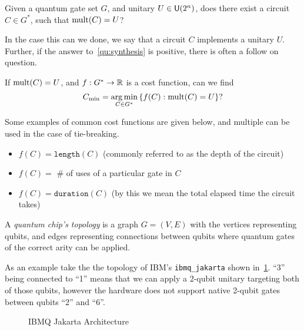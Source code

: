 \begin{question}\label{qu:synthesis}
    Given a quantum gate set $G$, and unitary $U\in\mathsf{U} (2^n)$, does there exist a circuit $C\in G^*$, such that $\operatorname{mult}(C) = U$?
\end{question}
In the case this can we done, we say that a circuit $C$ implements a unitary $U$.
Further, if the answer to~\ref{qu:synthesis} is positive, there is often a follow on question.
\begin{question}\label{qu:optimalsynthesis}
    If $\operatorname{mult}(C) = U$, and $f: G^* \to \mathbb{R}$ is a cost function, can we find
    \begin{equation*}
        C_\text{min} = \operatorname*{arg\,min}_{C\in G^*} \qty{f(C) : \operatorname{mult}(C) = U}?
    \end{equation*}
\end{question}
Some examples of common cost functions are given below, and multiple can be used in the case of tie-breaking.
\begin{itemize}
    \item $f(C) = \mathtt{length}(C)$ (commonly referred to as the depth of the circuit)
    \item $f(C) = $ \# of uses of a particular gate in $C$
    \item $f(C) = \mathtt{duration}(C)$ (by this we mean the total elapsed time the circuit takes)
\end{itemize}

\begin{definition}
    A \emph{quantum chip's topology} is a graph $G = (V, E)$ with the vertices representing qubits, and edges representing connections between qubits where quantum gates of the correct arity can be applied.
\end{definition}

As an example take the the topology of IBM's \texttt{ibmq\_jakarta} shown in~\ref{fig:ibm-jakarta}.
``3'' being connected to ``1'' means that we can apply a 2-qubit unitary targeting both of those qubits, however the hardware does not support native 2-qubit gates between qubits ``2'' and ``6''.
\begin{figure}[ht]
    \centering
    \caption{IBMQ Jakarta Architecture}\label{fig:ibm-jakarta}
\end{figure}

